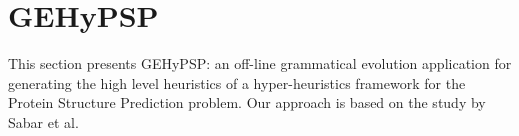\documentclass[conference]{IEEEtran}
\begin{document}
%
%
%
%
%	
%	 
% 
%	
%
%	
%


\section{GEHyPSP}
\label{sec:methodology}
This section presents GEHyPSP: an off-line grammatical evolution application for generating the high level heuristics of a hyper-heuristics framework for the Protein Structure Prediction problem. Our approach is based on the study by Sabar et al. \cite{sabar2015automatic}
\end{document}
